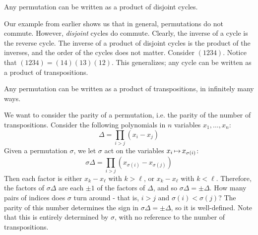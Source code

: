 \begin{crll}
    Any permutation can be written as a product of disjoint cycles.
\end{crll}

Our example from earlier shows us that in general, permutations do not commute.
However, \textit{disjoint} cycles do commute. \vsp
%
Clearly, the inverse of a cycle is the reverse cycle.
The inverse of a product of disjoint cycles is the product of the inverses,
and the order of the cycles does not matter. \vsp
%
Consider $ (1234) $. Notice that $ (1234) = (14)(13)(12) $.
This generalizes; any cycle can be written as a product of transpositions.

\begin{crll}
    Any permutation can be written as a product of transpositions, in infinitely many ways.
\end{crll}

\newpage
We want to consider the parity of a permutation, i.e. the parity of the number of
transpositions. \vsp
%
Consider the following polynomials in $ n $ variables $ x_{1}, \dots, x_{n} $:
\begin{equation*}
    \Delta = \prod_{i > j} (x_{i}-x_{j})
\end{equation*}
Given a permutation $ \sigma $,
we let $ \sigma $ act on the variables $ x_{i} \operatorname{\mapsto} x_{\sigma(i)} $:
\begin{equation*}
    \sigma\Delta = \prod_{i>j} (x_{\sigma(i)} - x_{\sigma(j)})
\end{equation*}
Then each factor is either $ x_{k} - x_{\ell} $ with $ k > \ell $,
or $ x_{k} - x_{\ell} $ with $ k < \ell $.
Therefore, the factors of $ \sigma\Delta $ are each $ \pm 1 $ of the factors of $ \Delta $,
and so $ \sigma\Delta = \pm\Delta $.
How many pairs of indices does $ \sigma $ turn around - that is,
$ i > j $ and $ \sigma(i) < \sigma(j) $? \vsp
%
The parity of this number determines the sign in $ \sigma\Delta = \pm\Delta $,
so it is well-defined. Note that this is entirely determined by $ \sigma $, with no reference
to the number of transpositions.


